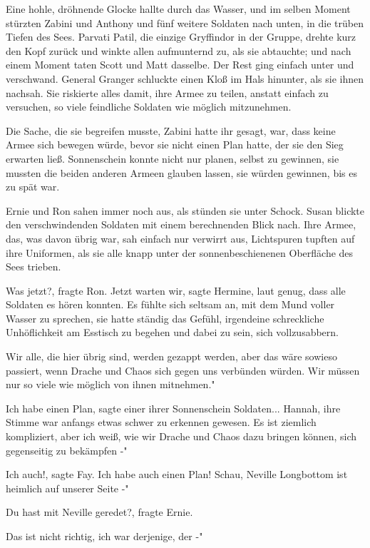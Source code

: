 Eine hohle, dröhnende Glocke hallte durch das Wasser, und im selben Moment
stürzten Zabini und Anthony und fünf weitere Soldaten nach unten, in die trüben
Tiefen des Sees. Parvati Patil, die einzige Gryffindor in der Gruppe, drehte
kurz den Kopf zurück und winkte allen aufmunternd zu, als sie abtauchte; und
nach einem Moment taten Scott und Matt dasselbe. Der Rest ging einfach unter und
verschwand. General Granger schluckte einen Kloß im Hals hinunter, als sie ihnen
nachsah. Sie riskierte alles damit, ihre Armee zu teilen, anstatt einfach zu
versuchen, so viele feindliche Soldaten wie möglich mitzunehmen.

Die Sache, die sie begreifen musste, Zabini hatte ihr gesagt, war, dass keine
Armee sich bewegen würde, bevor sie nicht einen Plan hatte, der sie den Sieg
erwarten ließ. Sonnenschein konnte nicht nur planen, selbst zu gewinnen, sie
mussten die beiden anderen Armeen glauben lassen, sie würden gewinnen, bis es zu
spät war.

Ernie und Ron sahen immer noch aus, als stünden sie unter Schock. Susan blickte
den verschwindenden Soldaten mit einem berechnenden Blick nach. Ihre Armee, das,
was davon übrig war, sah einfach nur verwirrt aus, Lichtspuren tupften auf ihre
Uniformen, als sie alle knapp unter der sonnenbeschienenen Oberfläche des Sees
trieben.

\glqq Was jetzt?\grqq{}, fragte Ron. \glqq Jetzt warten wir\grqq{}, sagte
Hermine, laut genug, dass alle Soldaten es hören konnten. Es fühlte sich seltsam
an, mit dem Mund voller Wasser zu sprechen, sie hatte ständig das Gefühl,
irgendeine schreckliche Unhöflichkeit am Esstisch zu begehen und dabei zu sein,
sich vollzusabbern.

\glqq Wir alle, die hier übrig sind, werden gezappt werden, aber das wäre
sowieso passiert, wenn Drache und Chaos sich gegen uns verbünden würden. Wir
müssen nur so viele wie möglich von ihnen mitnehmen."

\glqq Ich habe einen Plan\grqq{}, sagte einer ihrer Sonnenschein Soldaten...
Hannah, ihre Stimme war anfangs etwas schwer zu erkennen gewesen. \glqq Es ist
ziemlich kompliziert, aber ich weiß, wie wir Drache und Chaos dazu bringen
können, sich gegenseitig zu bekämpfen -"

\glqq Ich auch!\grqq{}, sagte Fay. \glqq Ich habe auch einen Plan! Schau,
Neville Longbottom ist heimlich auf unserer Seite -"

\glqq Du hast mit Neville geredet?\grqq{}, fragte Ernie.

\glqq Das ist nicht richtig, ich war derjenige, der -"

